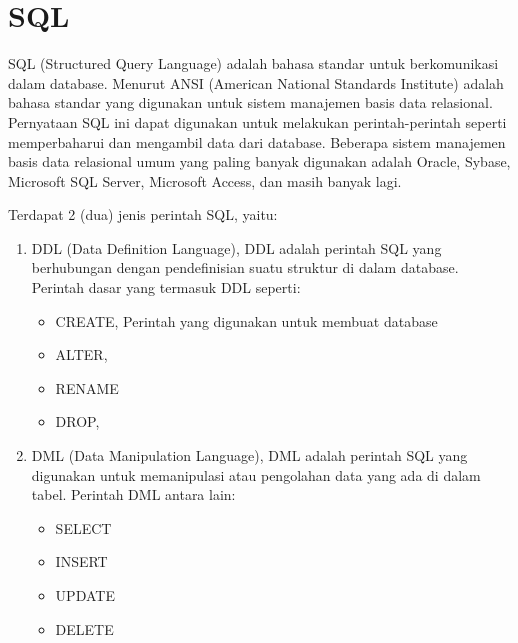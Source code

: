 \section{SQL}
SQL (Structured Query Language) adalah bahasa standar untuk berkomunikasi dalam database. Menurut ANSI (American National Standards Institute) adalah bahasa standar yang digunakan untuk sistem manajemen basis data relasional. Pernyataan SQL ini dapat digunakan untuk melakukan perintah-perintah seperti memperbaharui dan mengambil data dari database. Beberapa sistem manajemen basis data relasional umum yang paling banyak digunakan adalah Oracle, Sybase, Microsoft SQL Server, Microsoft Access, dan masih banyak lagi.
\par
Terdapat 2 (dua) jenis perintah SQL, yaitu:
\begin{enumerate}
\item DDL (Data Definition Language), DDL adalah perintah SQL yang berhubungan dengan pendefinisian suatu struktur di dalam database. Perintah dasar yang termasuk DDL seperti:

\begin{itemize}
\item CREATE, Perintah yang digunakan untuk membuat database
\item ALTER, 
\item RENAME
\item DROP, 
\end{itemize}

\item DML (Data Manipulation Language), DML adalah perintah SQL yang digunakan untuk memanipulasi atau pengolahan data yang ada di dalam tabel. Perintah DML antara lain:

\begin{itemize}
\item SELECT
\item INSERT
\item UPDATE
\item DELETE
\end{itemize}
\end{enumerate}

